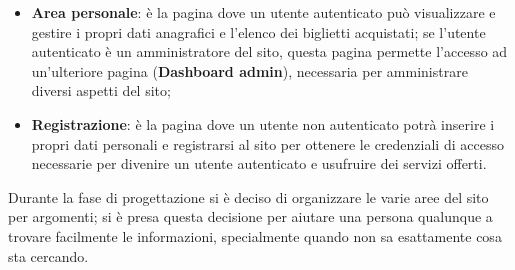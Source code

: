 \begin{itemize}
        \item \textbf{Area personale}: è la pagina dove un utente autenticato può visualizzare e gestire i propri dati anagrafici e l'elenco dei biglietti acquistati; se l'utente autenticato è un amministratore del sito, questa pagina permette l'accesso ad un'ulteriore pagina (\textbf{Dashboard admin}), necessaria per amministrare diversi aspetti del sito;
        \item \textbf{Registrazione}: è la pagina dove un utente non autenticato potrà inserire i propri dati personali e registrarsi al sito per ottenere le credenziali di accesso necessarie per divenire un utente autenticato e usufruire dei servizi offerti.
    \end{itemize}
    \noindent
    Durante la fase di progettazione si è deciso di organizzare le varie aree del sito per argomenti; si è presa questa decisione per aiutare una persona qualunque a trovare facilmente le informazioni, specialmente quando non sa esattamente cosa sta cercando.